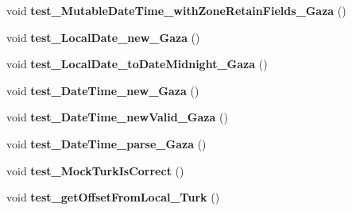 \begin{DoxyCompactItemize}
\item 
\hypertarget{classorg_1_1joda_1_1time_1_1_test_date_time_zone_cutover_a6df82dda49a5b267d22b6c464e0a3cdf}{void {\bfseries test\-\_\-\-Mutable\-Date\-Time\-\_\-with\-Zone\-Retain\-Fields\-\_\-\-Gaza} ()}\label{classorg_1_1joda_1_1time_1_1_test_date_time_zone_cutover_a6df82dda49a5b267d22b6c464e0a3cdf}

\item 
\hypertarget{classorg_1_1joda_1_1time_1_1_test_date_time_zone_cutover_a1a79f4a48e5d5ff5bdaae1114df6b552}{void {\bfseries test\-\_\-\-Local\-Date\-\_\-new\-\_\-\-Gaza} ()}\label{classorg_1_1joda_1_1time_1_1_test_date_time_zone_cutover_a1a79f4a48e5d5ff5bdaae1114df6b552}

\item 
\hypertarget{classorg_1_1joda_1_1time_1_1_test_date_time_zone_cutover_a452fc1f2289fee98702cf7380b34f8fb}{void {\bfseries test\-\_\-\-Local\-Date\-\_\-to\-Date\-Midnight\-\_\-\-Gaza} ()}\label{classorg_1_1joda_1_1time_1_1_test_date_time_zone_cutover_a452fc1f2289fee98702cf7380b34f8fb}

\item 
\hypertarget{classorg_1_1joda_1_1time_1_1_test_date_time_zone_cutover_a552169dda509c3ccdaf7931864487817}{void {\bfseries test\-\_\-\-Date\-Time\-\_\-new\-\_\-\-Gaza} ()}\label{classorg_1_1joda_1_1time_1_1_test_date_time_zone_cutover_a552169dda509c3ccdaf7931864487817}

\item 
\hypertarget{classorg_1_1joda_1_1time_1_1_test_date_time_zone_cutover_a6a14d72981ebdccdb0239f89d9ff16c1}{void {\bfseries test\-\_\-\-Date\-Time\-\_\-new\-Valid\-\_\-\-Gaza} ()}\label{classorg_1_1joda_1_1time_1_1_test_date_time_zone_cutover_a6a14d72981ebdccdb0239f89d9ff16c1}

\item 
\hypertarget{classorg_1_1joda_1_1time_1_1_test_date_time_zone_cutover_a0c23b1c4005fbec4d1304da5cbc16e25}{void {\bfseries test\-\_\-\-Date\-Time\-\_\-parse\-\_\-\-Gaza} ()}\label{classorg_1_1joda_1_1time_1_1_test_date_time_zone_cutover_a0c23b1c4005fbec4d1304da5cbc16e25}

\item 
\hypertarget{classorg_1_1joda_1_1time_1_1_test_date_time_zone_cutover_afac82c12c24cf4cf2e796150234ae1b4}{void {\bfseries test\-\_\-\-Mock\-Turk\-Is\-Correct} ()}\label{classorg_1_1joda_1_1time_1_1_test_date_time_zone_cutover_afac82c12c24cf4cf2e796150234ae1b4}

\item 
\hypertarget{classorg_1_1joda_1_1time_1_1_test_date_time_zone_cutover_a7ba17d56ff6cf6210d0a0c79c38fd3ee}{void {\bfseries test\-\_\-get\-Offset\-From\-Local\-\_\-\-Turk} ()}\label{classorg_1_1joda_1_1time_1_1_test_date_time_zone_cutover_a7ba17d56ff6cf6210d0a0c79c38fd3ee}


\end{DoxyCompactItemize}
